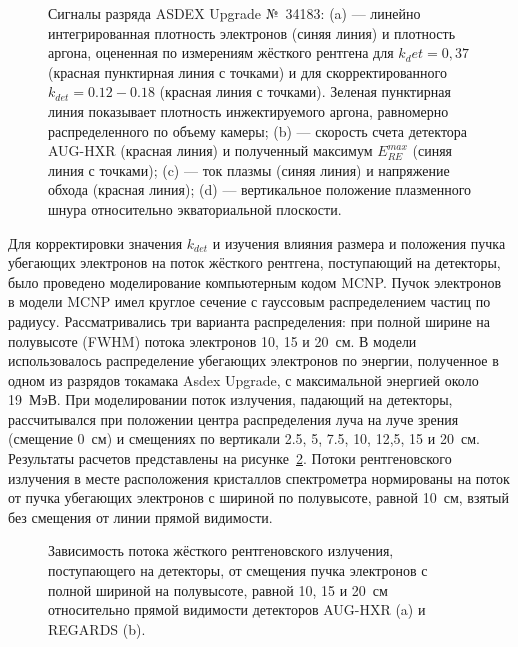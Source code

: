\begin{figure}[ht!]
  \caption{ Сигналы разряда ASDEX Upgrade №~34183: (a) --- линейно интегрированная плотность электронов (синяя линия) и плотность аргона, оцененная по измерениям жёсткого рентгена для $k_det = 0,37$ (красная пунктирная линия с точками) и для скорректированного $k_{det} = 0.12-0.18$ (красная линия с точками). Зеленая пунктирная линия показывает плотность инжектируемого аргона, равномерно распределенного по объему камеры; (b) --- скорость счета детектора AUG-HXR (красная линия) и полученный максимум $E_{RE}^{max}$ (синяя линия с точками); (c) --- ток плазмы (синяя линия) и напряжение обхода (красная линия); (d) --- вертикальное положение плазменного шнура относительно экваториальной плоскости.~\cite{Shevelev2021} }
  \label{fig:asdexPlasmaParamsPulse34183}
\end{figure}

Для корректировки значения $k_{det}$ и изучения влияния размера и положения пучка убегающих электронов на поток жёсткого рентгена, поступающий на детекторы, было проведено моделирование компьютерным кодом MCNP. Пучок электронов в модели MCNP имел круглое сечение с гауссовым распределением частиц по радиусу. Рассматривались три варианта распределения: при полной ширине на полувысоте (FWHM) потока электронов 10, 15 и 20~см. В модели использовалось распределение убегающих электронов по энергии, полученное в одном из разрядов токамака Asdex Upgrade, с максимальной энергией около 19~МэВ. При моделировании поток излучения, падающий на детекторы, рассчитывался при положении центра распределения луча на луче зрения (смещение 0~см) и смещениях по вертикали 2.5, 5, 7.5, 10, 12,5, 15 и 20~см. Результаты расчетов представлены на рисунке~\ref{fig:asdexModelHxrFlux}. Потоки рентгеновского излучения в месте расположения кристаллов спектрометра нормированы на поток от пучка убегающих электронов с шириной по полувысоте, равной 10~см, взятый без смещения от линии прямой видимости.~\cite{Shevelev2021}

\begin{figure}[ht!]
  \caption{ Зависимость потока жёсткого рентгеновского излучения, поступающего на детекторы, от смещения пучка электронов с полной шириной на полувысоте, равной 10, 15 и 20~см относительно прямой видимости детекторов AUG-HXR (a) и REGARDS (b).~\cite{Shevelev2021} }
  \label{fig:asdexModelHxrFlux}
\end{figure}

